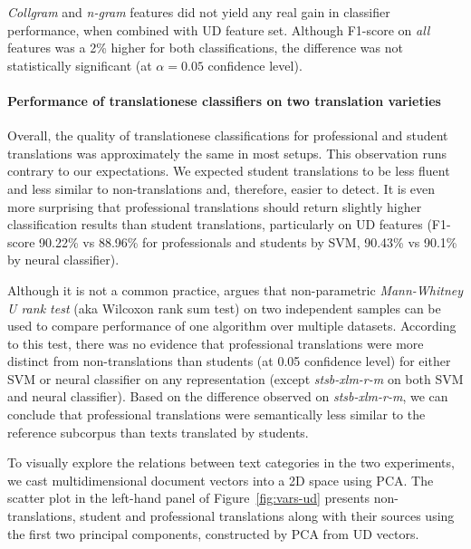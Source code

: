 \textit{Collgram} and \textit{n-gram} features did not yield any real gain in classifier performance, when combined with UD feature set. Although F1-score on \textit{all} features was a 2\% higher for both classifications, the difference was not statistically significant (at $\alpha=0.05$ confidence level).


\paragraph{Performance of translationese classifiers on two translation varieties}
Overall, the quality of translationese classifications for professional and student translations was approximately the same in most setups. This observation runs contrary to our expectations. We expected student translations to be less fluent and less similar to non-translations and, therefore, easier to detect. 
It is even more surprising that professional translations should return slightly higher classification results than student translations, particularly on UD features (F1-score 90.22\% vs 88.96\% for professionals and students by SVM, 90.43\% vs 90.1\% by neural classifier).

Although it is not a common practice, \citet{Demvsar2006} argues that non-parametric \textit{Mann-Whitney U rank test} (aka Wilcoxon rank sum test) on two independent samples can be used to compare performance of one algorithm over multiple datasets. 
According to this test, there was no evidence that professional translations were more distinct from non-translations than students (at 0.05 confidence level) for either SVM or neural classifier on any representation (except \textit{stsb-xlm-r-m} on both SVM and neural classifier).
Based on the difference observed on \textit{stsb-xlm-r-m}, we can conclude that professional translations were semantically less similar to the reference subcorpus than texts translated by students. 

To visually explore the relations between text categories in the two experiments, we cast multidimensional document vectors into a 2D space using PCA. 
The scatter plot in the left-hand panel of Figure~\ref{fig:vars-ud} presents non-translations, student and professional translations along with their sources using the first two principal components, constructed by PCA from UD vectors.

